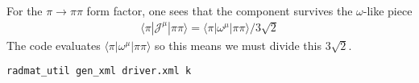 \documentclass[prd,showpacs,showkeys,preprintnumbers,floatfix,
nofootinbib,superscriptaddress]{revtex4}
\begin{document}
For the $\pi\to \pi\pi$ form factor, one sees that the component survives the $\omega$-like piece
\begin{align}
\langle\pi|{\mathcal{J}}^{\mu}|\pi\pi\rangle=
\langle\pi|\omega^{\mu}|\pi\pi\rangle/3 \sqrt{2}
\end{align}
The code evaluates $\langle\pi|\omega^{\mu}|\pi\pi\rangle$ so this means we must divide this $3\sqrt{2}$. 
\\


\footnotesize
\begin{verbatim}
radmat_util gen_xml driver.xml k
\end{verbatim} 
\normalsize
\end{document}
